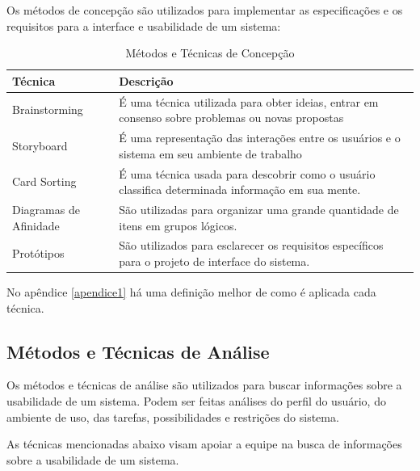 Os métodos de concepção são utilizados para implementar as especificações e os requisitos para a interface e usabilidade de um sistema:

\begin{table}[h]
\centering
\begin{tabular}{|p{4cm}|p{8cm}|}
\hline 
Técnica & Descrição \\ 
\hline 
Brainstorming & É uma técnica utilizada para obter ideias, entrar em consenso sobre problemas ou novas propostas \\ 
\hline 
Storyboard & É uma representação das interações entre os usuários e o sistema em seu ambiente de trabalho \\ 
\hline 
Card Sorting & É uma técnica usada para descobrir como o usuário classifica determinada informação em sua mente. \\ 
\hline 
Diagramas de Afinidade & São utilizadas para organizar uma grande quantidade de itens em grupos lógicos. \\ 
\hline 
Protótipos & São utilizados para esclarecer os requisitos específicos para o projeto de interface do sistema. \\ 
\hline 
\end{tabular}
\caption{Métodos e Técnicas de Concepção}
\end{table}


No apêndice \ref{apendice1} há uma definição melhor de como é aplicada cada técnica.


\subsection{Métodos e Técnicas de Análise}

Os métodos e técnicas de análise são utilizados para buscar informações sobre a usabilidade de um sistema. Podem ser feitas análises do perfil do usuário, do ambiente de uso, das tarefas, possibilidades e restrições do sistema.

As técnicas mencionadas abaixo visam apoiar a equipe na busca de informações sobre a usabilidade de um sistema. 

\newpage

